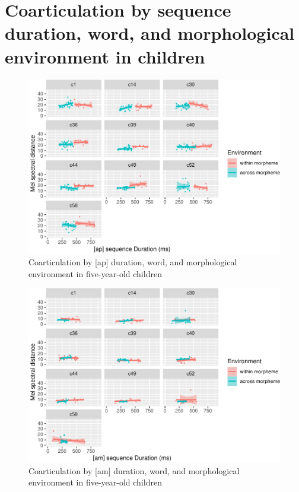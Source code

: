 \documentclass[a4paper,man,floatsintext,natbib,donotrepeattitle, apacite]{apa6}
\begin{document}
\section{Coarticulation by sequence duration, word, and morphological environment in children}\label{app:app-E}

\begin{figure}
\centering
\includegraphics{3_ch3_results_files/figure-latex/five-facet-ap-1.pdf}
\caption{\label{fig:five-facet-ap}Coarticulation by {[}ap{]} duration, word, and morphological environment in five-year-old children}
\end{figure}

\begin{figure}
\centering
\includegraphics{3_ch3_results_files/figure-latex/five-facet-am-1.pdf}
\caption{\label{fig:five-facet-am}Coarticulation by {[}am{]} duration, word, and morphological environment in five-year-old children}
\end{figure}
\end{document}
